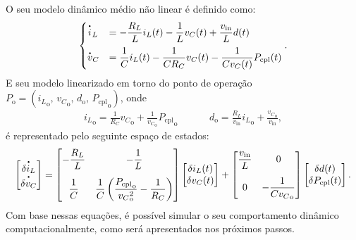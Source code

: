 O seu modelo dinâmico médio não linear é definido como: \begin{equation}\begin{cases} \dt{i}_L &= \displaystyle - \frac{R_L}{L} i_L(t) - \frac{1}{L} v_C(t) + \frac{v_{\mathrm{in}}}{L}d(t)  \\[8pt] \dt{v}_C &= \displaystyle \frac{1}{C} i_L(t) - \frac{1}{C R_C} v_C(t) - \frac{1}{C v_C(t)} P_{\mathrm{cpl}}(t) \label{eq:buck_nonlinear_system} \end{cases}.\end{equation} E seu modelo linearizado em torno do ponto de operação $P_{\mathrm{o}} = \left({i_L}_{\mathrm{o}}, \, {v_C}_{\mathrm{o}}, \, d_{\mathrm{o}}, \, {P_{\mathrm{cpl}}}_{\mathrm{o}} \right)$, onde \begin{equation}\begin{aligned}
    {i_L}_{\mathrm{o}} = \frac{1}{R_C} {v_C}_{\mathrm{o}} + \frac{1}{{v_C}_{\mathrm{o}}} {P_{\mathrm{cpl}}}_{\mathrm{o}} 
     \hspace{1cm}&
    d_{\mathrm{o}} = \frac{R_L}{v_{\mathrm{in}}} {i_L}_{\mathrm{o}} + \frac{{v_C}_{\mathrm{o}}}{v_{\mathrm{in}}}
    \label{eq:operation_point},
  \end{aligned}
\end{equation} é representado pelo seguinte espaço de estados: \begin{equation} \begin{bmatrix} \dt{\delta i_L} \\ \dt{\delta v_C} \end{bmatrix} = \begin{bmatrix} \displaystyle -\frac{R_L}{L} & \displaystyle -\frac{1}{L}  \\[12pt] \displaystyle \frac{1}{C} & \displaystyle \frac{1}{C}\left(\frac{{P_{\mathrm{cpl}}}_{\mathrm{o}}}{{{v_{C}}^2_{\mathrm{o}}}} - \frac{1}{R_C}\right) \end{bmatrix} \begin{bmatrix} \delta i_L(t) \\ \delta v_C(t) \end{bmatrix} + \begin{bmatrix} {\displaystyle \frac{v_{\mathrm{in}}}{L}} & 0 \\[12pt] 0 & \displaystyle {-\frac{1}{C{v_C}_{\mathrm{o}}}} \end{bmatrix}  \begin{bmatrix} \delta d(t) \\ \delta P_{\mathrm{cpl}}(t) \end{bmatrix}. \label{eq:buck_sistema_linearizado}\end{equation} Com base nessas equações, é possível simular o seu comportamento dinâmico computacionalmente, como será apresentados nos próximos passos.

